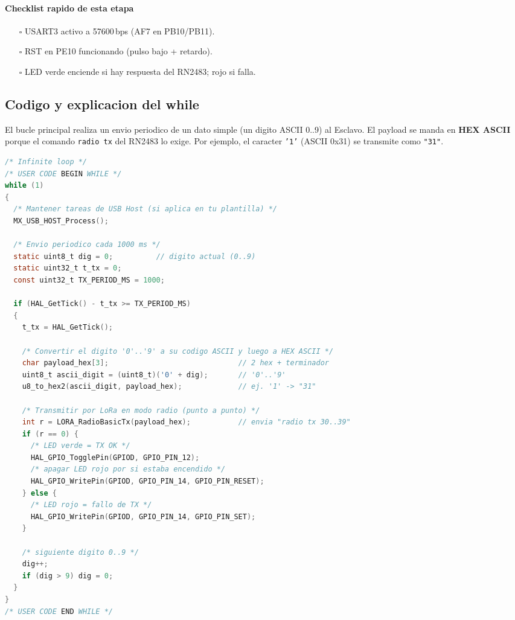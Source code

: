 \documentclass[a4paper,12pt]{article}
\begin{document}
\paragraph{Checklist rapido de esta etapa}
\begin{itemize}
  \item[$\square$] USART3 activo a 57600\,bps (AF7 en PB10/PB11).
  \item[$\square$] RST en PE10 funcionando (pulso bajo + retardo).
  \item[$\square$] LED verde enciende si hay respuesta del RN2483; rojo si falla.
\end{itemize}

\subsection{Codigo y explicacion del while}

El bucle principal realiza un envio periodico de un dato simple (un digito ASCII 0..9) al Esclavo. El payload se manda en \textbf{HEX ASCII} porque el comando \texttt{radio tx} del RN2483 lo exige. Por ejemplo, el caracter \texttt{'1'} (ASCII 0x31) se transmite como \texttt{"31"}.
\newpage

\begin{lstlisting}[language=C, caption={While del Maestro: envio periodico 0..9 en HEX ASCII}, label={lst:maestro_while}]
/* Infinite loop */
/* USER CODE BEGIN WHILE */
while (1)
{
  /* Mantener tareas de USB Host (si aplica en tu plantilla) */
  MX_USB_HOST_Process();

  /* Envio periodico cada 1000 ms */
  static uint8_t dig = 0;          // digito actual (0..9)
  static uint32_t t_tx = 0;
  const uint32_t TX_PERIOD_MS = 1000;

  if (HAL_GetTick() - t_tx >= TX_PERIOD_MS)
  {
    t_tx = HAL_GetTick();

    /* Convertir el digito '0'..'9' a su codigo ASCII y luego a HEX ASCII */
    char payload_hex[3];                              // 2 hex + terminador
    uint8_t ascii_digit = (uint8_t)('0' + dig);       // '0'..'9'
    u8_to_hex2(ascii_digit, payload_hex);             // ej. '1' -> "31"

    /* Transmitir por LoRa en modo radio (punto a punto) */
    int r = LORA_RadioBasicTx(payload_hex);           // envia "radio tx 30..39"
    if (r == 0) {
      /* LED verde = TX OK */
      HAL_GPIO_TogglePin(GPIOD, GPIO_PIN_12);
      /* apagar LED rojo por si estaba encendido */
      HAL_GPIO_WritePin(GPIOD, GPIO_PIN_14, GPIO_PIN_RESET);
    } else {
      /* LED rojo = fallo de TX */
      HAL_GPIO_WritePin(GPIOD, GPIO_PIN_14, GPIO_PIN_SET);
    }

    /* siguiente digito 0..9 */
    dig++;
    if (dig > 9) dig = 0;
  }
}
/* USER CODE END WHILE */
\end{lstlisting}
\end{document}
